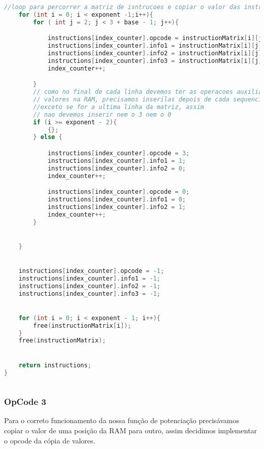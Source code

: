 \documentclass{article}
\begin{document}
\begin{lstlisting}[caption={Função generatePotentiationInstructions},label={lst:cod4},language=C]
    //loop para percorrer a matriz de isntrucoes e copiar o valor das instrucoes para nosso vetor final
    for (int i = 0; i < exponent -1;i++){
        for ( int j = 2; j < 3 + base - 1; j++){

            instructions[index_counter].opcode = instructionMatrix[i][j].opcode;
            instructions[index_counter].info1 = instructionMatrix[i][j].info1; 
            instructions[index_counter].info2 = instructionMatrix[i][j].info2; 
            instructions[index_counter].info3 = instructionMatrix[i][j].info3; 
            index_counter++;

        }
        // como no final de cada linha devemos ter as operacoes auxiliares para modificar
        // valores na RAM, precisamos inserilas depois de cada sequencia de soma
        //exceto se for a ultima linha da matriz, assim
        // nao devemos inserir nem o 3 nem o 0
        if (i >= exponent - 2){
            {};
        } else {

            instructions[index_counter].opcode = 3;
            instructions[index_counter].info1 = 1; 
            instructions[index_counter].info2 = 0; 
            index_counter++;

            instructions[index_counter].opcode = 0;
            instructions[index_counter].info1 = 0; 
            instructions[index_counter].info2 = 1; 
            index_counter++;
        }


    }


    instructions[index_counter].opcode = -1;
    instructions[index_counter].info1 = -1;
    instructions[index_counter].info2 = -1;
    instructions[index_counter].info3 = -1;


    for (int i = 0; i < exponent - 1; i++){
        free(instructionMatrix[i]);
    }
    free(instructionMatrix);


    return instructions;
}
    

\end{lstlisting}
\clearpage
\subsubsection{OpCode 3}

Para o correto funcionamento da nossa função de potenciação precisávamos copiar o valor de uma posição da RAM para outro, assim decidimos implementar o opcode da cópia de valores.
\end{document}
